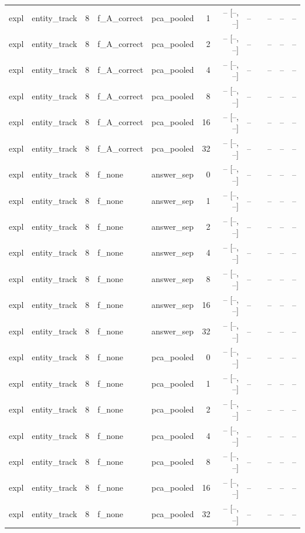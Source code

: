 \begin{tabular}{llrllrrrlrrr}
expl & entity\_track & 8 & f\_A\_correct & pca\_pooled & 1 & -- [--, --] & -- &  & -- & -- & -- \\
expl & entity\_track & 8 & f\_A\_correct & pca\_pooled & 2 & -- [--, --] & -- &  & -- & -- & -- \\
expl & entity\_track & 8 & f\_A\_correct & pca\_pooled & 4 & -- [--, --] & -- &  & -- & -- & -- \\
expl & entity\_track & 8 & f\_A\_correct & pca\_pooled & 8 & -- [--, --] & -- &  & -- & -- & -- \\
expl & entity\_track & 8 & f\_A\_correct & pca\_pooled & 16 & -- [--, --] & -- &  & -- & -- & -- \\
expl & entity\_track & 8 & f\_A\_correct & pca\_pooled & 32 & -- [--, --] & -- &  & -- & -- & -- \\
expl & entity\_track & 8 & f\_none & answer\_sep & 0 & -- [--, --] & -- &  & -- & -- & -- \\
expl & entity\_track & 8 & f\_none & answer\_sep & 1 & -- [--, --] & -- &  & -- & -- & -- \\
expl & entity\_track & 8 & f\_none & answer\_sep & 2 & -- [--, --] & -- &  & -- & -- & -- \\
expl & entity\_track & 8 & f\_none & answer\_sep & 4 & -- [--, --] & -- &  & -- & -- & -- \\
expl & entity\_track & 8 & f\_none & answer\_sep & 8 & -- [--, --] & -- &  & -- & -- & -- \\
expl & entity\_track & 8 & f\_none & answer\_sep & 16 & -- [--, --] & -- &  & -- & -- & -- \\
expl & entity\_track & 8 & f\_none & answer\_sep & 32 & -- [--, --] & -- &  & -- & -- & -- \\
expl & entity\_track & 8 & f\_none & pca\_pooled & 0 & -- [--, --] & -- &  & -- & -- & -- \\
expl & entity\_track & 8 & f\_none & pca\_pooled & 1 & -- [--, --] & -- &  & -- & -- & -- \\
expl & entity\_track & 8 & f\_none & pca\_pooled & 2 & -- [--, --] & -- &  & -- & -- & -- \\
expl & entity\_track & 8 & f\_none & pca\_pooled & 4 & -- [--, --] & -- &  & -- & -- & -- \\
expl & entity\_track & 8 & f\_none & pca\_pooled & 8 & -- [--, --] & -- &  & -- & -- & -- \\
expl & entity\_track & 8 & f\_none & pca\_pooled & 16 & -- [--, --] & -- &  & -- & -- & -- \\
expl & entity\_track & 8 & f\_none & pca\_pooled & 32 & -- [--, --] & -- &  & -- & -- & -- \\

\end{tabular}
